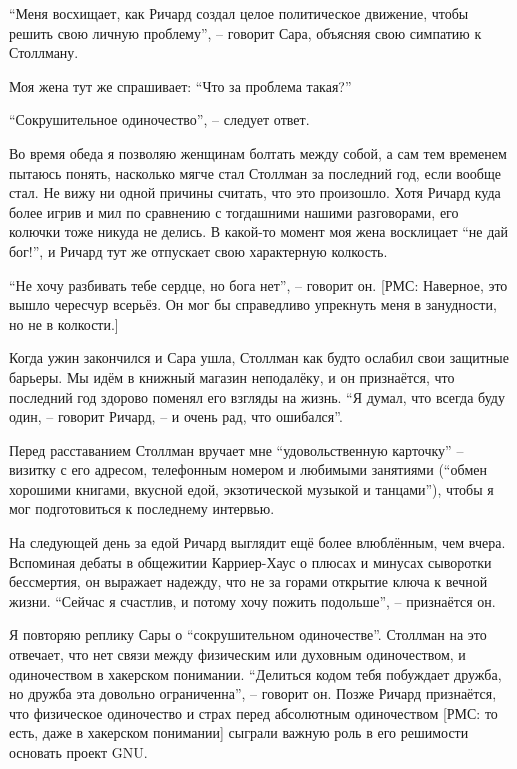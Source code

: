 \enquote{Меня восхищает, как Ричард создал целое политическое движение, чтобы решить свою личную проблему}, -- говорит Сара, объясняя свою симпатию к Столлману.

Моя жена тут же спрашивает: \enquote{Что за проблема такая?}

\enquote{Сокрушительное одиночество}, -- следует ответ.

Во время обеда я позволяю женщинам болтать между собой, а сам тем временем пытаюсь понять, насколько мягче стал Столлман за последний год, если вообще стал. Не вижу ни одной причины считать, что это произошло. Хотя Ричард куда более игрив и мил по сравнению с тогдашними нашими разговорами, его колючки тоже никуда не делись. В какой-то момент моя жена восклицает \enquote{не дай бог!}, и Ричард тут же отпускает свою характерную колкость.

\enquote{Не хочу разбивать тебе сердце, но бога нет}, -- говорит он. [РМС: Наверное, это вышло чересчур всерьёз. Он мог бы справедливо упрекнуть меня в занудности, но не в колкости.]

Когда ужин закончился и Сара ушла, Столлман как будто ослабил свои защитные барьеры. Мы идём в книжный магазин неподалёку, и он признаётся, что последний год здорово поменял его взгляды на жизнь. \enquote{Я думал, что всегда буду один, -- говорит Ричард, -- и очень рад, что ошибался}.

Перед расставанием Столлман вручает мне \enquote{удовольственную карточку} -- визитку с его адресом, телефонным номером и любимыми занятиями (\enquote{обмен хорошими книгами, вкусной едой, экзотической музыкой и танцами}), чтобы я мог подготовиться к последнему интервью.

На следующей день за едой Ричард выглядит ещё более влюблённым, чем вчера. Вспоминая дебаты в общежитии Карриер-Хаус о плюсах и минусах сыворотки бессмертия, он выражает надежду, что не за горами открытие ключа к вечной жизни. \enquote{Сейчас я счастлив, и потому хочу пожить подольше}, -- признаётся он.

Я повторяю реплику Сары о \enquote{сокрушительном одиночестве}. Столлман на это отвечает, что нет связи между физическим или духовным одиночеством, и одиночеством в хакерском понимании. \enquote{Делиться кодом тебя побуждает дружба, но дружба эта довольно ограниченна}, -- говорит он. Позже Ричард признаётся, что физическое одиночество и страх перед абсолютным одиночеством [РМС: то есть, даже в хакерском понимании] сыграли важную роль в его решимости основать проект GNU.

